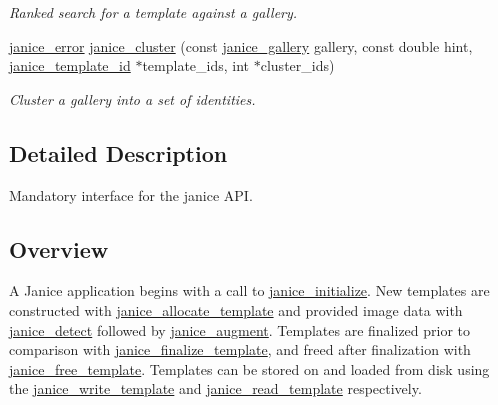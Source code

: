 \begin{DoxyCompactItemize}
\begin{DoxyCompactList}\small\item\em Ranked search for a template against a gallery. \end{DoxyCompactList}\item 
\hyperlink{group__janice_ga4873d49c1f9d6a6880dfbd485cf6ba72}{janice\+\_\+error} \hyperlink{group__janice_ga20d0206073850de0224651441c980ee7}{janice\+\_\+cluster} (const \hyperlink{group__janice_ga08feff1c2835b44332afeda80c3d0fb7}{janice\+\_\+gallery} gallery, const double hint, \hyperlink{group__janice_ga5ec62465fbbc7a92faadfefd3d20e25b}{janice\+\_\+template\+\_\+id} $\ast$template\+\_\+ids, int $\ast$cluster\+\_\+ids)
\begin{DoxyCompactList}\small\item\em Cluster a gallery into a set of identities. \end{DoxyCompactList}\end{DoxyCompactItemize}


\subsection{Detailed Description}
Mandatory interface for the janice A\+P\+I. 

\hypertarget{group__janice_Overview}{}\subsection{Overview}\label{group__janice_Overview}
A Janice application begins with a call to \hyperlink{group__janice_ga099241a8ed3bab6da3247a15a471fc00}{janice\+\_\+initialize}. New templates are constructed with \hyperlink{group__janice_ga5709bc7f0fd329db20f72cac8639c328}{janice\+\_\+allocate\+\_\+template} and provided image data with \hyperlink{group__janice_ga689c273a241f8e8694468fa561a7184b}{janice\+\_\+detect} followed by \hyperlink{group__janice_gae05799e93603418e9f0df2ce4bda0301}{janice\+\_\+augment}. Templates are finalized prior to comparison with \hyperlink{group__janice_gaf4894cf8cd61aa1ec60541f11cdb6de8}{janice\+\_\+finalize\+\_\+template}, and freed after finalization with \hyperlink{group__janice_ga5fa70d9ddc0b9b74e9be28cd4772be9a}{janice\+\_\+free\+\_\+template}. Templates can be stored on and loaded from disk using the \hyperlink{group__janice_ga0d4dbc4c5af8e9be07634e5da920f51b}{janice\+\_\+write\+\_\+template} and \hyperlink{group__janice_gace5b3f84daa9349c4557f4e0c8b23a13}{janice\+\_\+read\+\_\+template} respectively.

